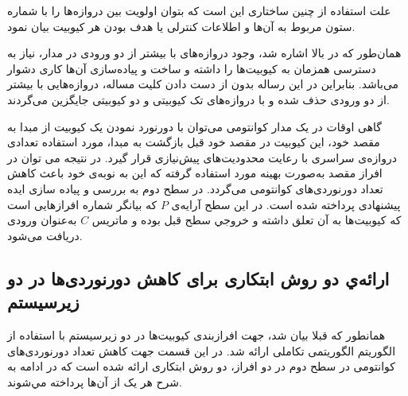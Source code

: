 علت استفاده از چنین ساختاری این است که بتوان اولویت بین دروازه‌ها را با شماره ستون مربوط به آن‌ها و اطلاعات کنترلی یا هدف بودن هر کیوبیت بیان نمود.


همان‌طور که در بالا اشاره شد، وجود دروازه‌های با بیشتر از دو ورودی در مدار، نیاز به دسترسی همزمان به کیوبیت‌ها را داشته و ساخت و پیاده‌سازی آن‌ها کاری دشوار می‌باشد. بنابراین در این رساله بدون از دست دادن کلیت مساله، دروازه‌هایی با بیشتر از دو ورودی حذف شده  و با دروازه‌های تک کیوبیتی و دو کیوبیتی جایگزین می‌گردند. 



گاهی اوقات در یک مدار کوانتومی می‌توان با دورنورد نمودن یک کیوبیت از مبدا به مقصد خود، این کیوبیت در مقصد خود قبل بازگشت به مبدا، مورد استفاده تعدادی دروازه‌ی سراسری با رعایت محدودیت‌های پیش‌نیازی قرار گیرد. در نتیجه می توان در افراز مقصد به‌صورت بهینه مورد استفاده گرفته که این به نوبه‌ی خود باعث کاهش تعداد دورنوردی‌های کوانتومی می‌گردد. در سطح دوم به بررسی و پیاده سازی ایده پیشنهادی پرداخته شده است.
در این سطح آرایه‌ی $P$ که بیانگر شماره‌ افرازهایی است که کیوبیت‌ها به آن تعلق داشته و خروجي سطح قبل بوده و ماتریس $C$ به‌عنوان ورودی دریافت می‌شود.
\subsection{ارائه‌ي دو روش ابتکاری برای كاهش دورنوردی‌ها در دو زیرسیستم}

همانطور که قبلا بیان شد، جهت افرازبندی کیوبیت‌ها در دو زیرسیستم با استفاده از الگوریتم  الگوریتمی تکاملی ارائه شد. در این قسمت جهت کاهش تعداد دورنوردی‌های کوانتومی در سطح دوم در دو افراز، دو روش ابتکاری ارائه شده است که در ادامه به شرح هر یک از آن‌ها پرداخته مي‌شوند.

